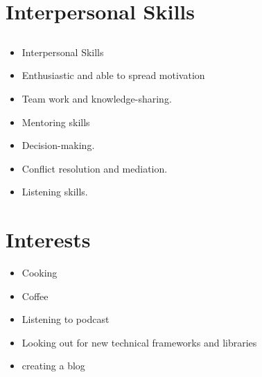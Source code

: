 \documentclass[letterpaper]{twentysecondcv} %
\begin{document}
\section{Interpersonal Skills}

\subsection{}{
	\begin{itemize}
		\item Interpersonal Skills
		\item Enthusiastic and able to spread motivation
		\item Team work and knowledge-sharing.
		\item Mentoring skills
		\item Decision-making.
		\item Conflict resolution and mediation.
		\item Listening skills.
	\end{itemize}
}

\section{Interests}
\begin{itemize}
	\item Cooking
	\item Coffee
	\item Listening to podcast
	\item Looking out for new technical frameworks and libraries
	\item creating a blog
\end{itemize}
\end{document}
